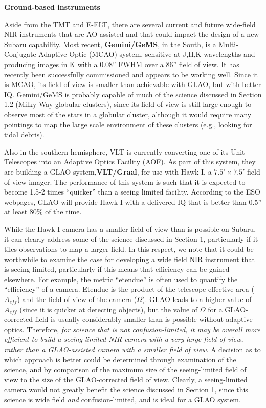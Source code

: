 \par\noindent
{\bf Ground-based instruments}

Aside from the TMT and E-ELT, there are several current and future
wide-field NIR instruments that are AO-assisted and that could impact
the design of a new Subaru capability. Most recent, {\bf Gemini/GeMS},
in the South, is a Multi-Conjugate Adaptive Optic (MCAO) system,
sensitive at J,H,K wavelengths and producing images in K with a 0.08''
FWHM over a 86'' field of view. It has recently been successfully
commissioned and appears to be working well. Since it is MCAO, its field
of view is smaller than achievable with GLAO, but with better
IQ. Gemini/GeMS is probably capable of much of the science discussed in
Section 1.2 (Milky Way globular clusters), since its field of view is
still large enough to observe most of the stars in a globular cluster,
although it would require many pointings to map the large scale
environment of these clusters (e.g., looking for tidal debris). 

Also in the southern hemisphere, VLT is currently converting one of its
Unit Telescopes into an Adaptive Optics Facility (AOF). As part of this
system, they are building a GLAO system,{\bf VLT/Graal}, for use with
Hawk-I, a $7.5'\times7.5'$ field of view imager. The performance of this
system is such that it is expected to become 1.5-2 times ``quicker''
than a seeing limited facility. According to the ESO webpages,  GLAO
will provide Hawk-I with a delivered IQ that is better than 0.5'' at
least 80\% of the time.  

While the Hawk-I camera has a smaller field of view than is possible on
Subaru, it can clearly address some of the science discussed in Section
1, particularly if it tiles observations to map a larger field. In this
respect, we note that it could be worthwhile to examine the case for
developing a wide field NIR instrument that is seeing-limited,
particularly if this means that efficiency can be gained elsewhere. For
example, the metric ``etendue'' is often used to quantify the
``efficiency'' of a camera. Etendue is the product of the telescope
effective area ($A_{eff}$) and the field of view of the camera
($\Omega$). GLAO leads to a higher value of $A_{eff}$ (since it is
quicker at detecting objects), but the value of $\Omega$ for a
GLAO-corrected field is usually considerably smaller than is possible
without adaptive optics. Therefore, {\it for science that is not
confusion-limited, it may be overall more efficient to build a
seeing-limited NIR camera with a very large field of view, rather than a
GLAO-assisted camera with a smaller  field of view}. A decision as to
which approach is better could be determined through examination of the
science, and by comparison of the maximum size of the seeing-limited
field of view to the size of the GLAO-corrected field of view. Clearly,
a seeing-limited camera would not greatly benefit the science discussed
in Section 1, since this science is wide field {\it and}
confusion-limited, and is ideal for a GLAO system. 

